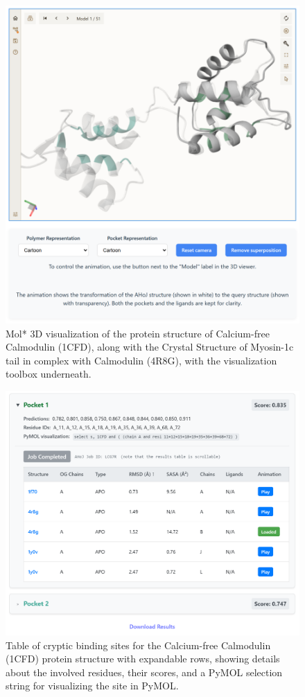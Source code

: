 \begin{figure}[htbp]
    \centering
    \includegraphics[width=\textwidth]{img/ui-molstar.png}
    \caption{Mol* 3D visualization of the protein structure of Calcium-free Calmodulin (1CFD), along with the Crystal Structure of Myosin-1c tail in complex with Calmodulin (4R8G), with the visualization toolbox underneath.}
    \label{fig:ui-molstar}
\end{figure}

\begin{figure}[htbp]
    \centering
    \includegraphics[width=\textwidth]{img/ui-table.png}
    \caption{Table of cryptic binding sites for the Calcium-free Calmodulin (1CFD) protein structure with expandable rows, showing details about the involved residues, their scores, and a PyMOL selection string for visualizing the site in PyMOL.}
    \label{fig:ui-table}
\end{figure}

